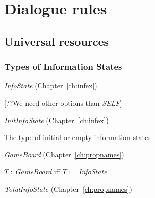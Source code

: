 \chapter{Dialogue rules}
\label{app:dialrules}

\section{Universal resources}

\subsection{Types of Information States}
\label{app:infostate}

\textit{InfoState} (Chapter~\ref{ch:infex})


[??We need other options than \textit{SELF}]

\textit{InitInfoState} (Chapter~\ref{ch:infex})

The type of initial or empty information states


\textit{GameBoard} (Chapter~\ref{ch:propnames})

$T$ : \textit{GameBoard} iff $T\sqsubseteq$ \textit{InfoState}

\textit{TotalInfoState} (Chapter~\ref{ch:propnames})


